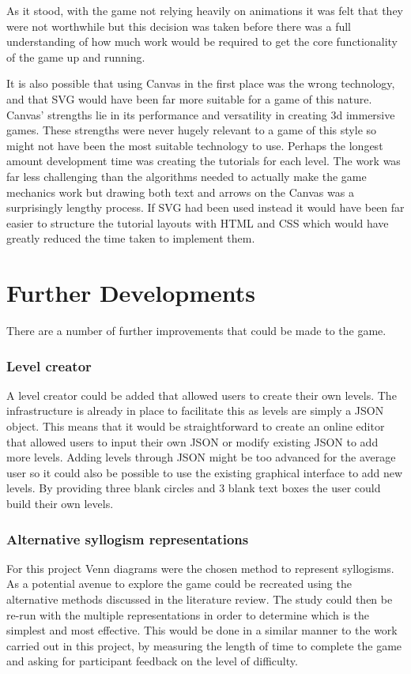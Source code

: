 \documentclass[12pt,a4paper]{report}
\begin{document}
As it stood, with the game not relying heavily on animations it was felt that they were not worthwhile but this decision was taken before there was a full understanding of how much work would be required to get the core functionality of the game up and running. 

It is also possible that using Canvas in the first place was the wrong technology, and that SVG would have been far more suitable for a game of this nature. Canvas' strengths lie in its performance and versatility in creating 3d immersive games. These strengths were never hugely relevant to a game of this style so might not have been the most suitable technology to use. Perhaps the longest amount development time was creating the tutorials for each level. The work was far less challenging than the algorithms needed to actually make the game mechanics work but drawing both text and arrows on the Canvas was a surprisingly lengthy process. If SVG had been used instead it would have been far easier to structure the tutorial layouts with HTML and CSS which would have greatly reduced the time taken to implement them.




\section{Further Developments}
There are a number of further improvements that could be made to the game.


\subsubsection{Level creator}
A level creator could be added that allowed users to create their own levels. The infrastructure is already in place to facilitate this as levels are simply a JSON object. This means that it would be straightforward to create an online editor that allowed users to input their own JSON or modify existing JSON to add more levels. Adding levels through JSON might be too advanced for the average user so it could also be possible to use the existing graphical interface to add new levels. By providing three blank circles and 3 blank text boxes the user could build their own levels. 


\subsubsection{Alternative syllogism representations}
For this project Venn diagrams were the chosen method to represent syllogisms. As a potential avenue to explore the game could be recreated using the alternative methods discussed in the literature review. The study could then be re-run with the multiple representations in order to determine which is the simplest and most effective. This would be done in a similar manner to the work carried out in this project, by measuring the length of time to complete the game  and asking for participant feedback on the level of difficulty.
\end{document}
